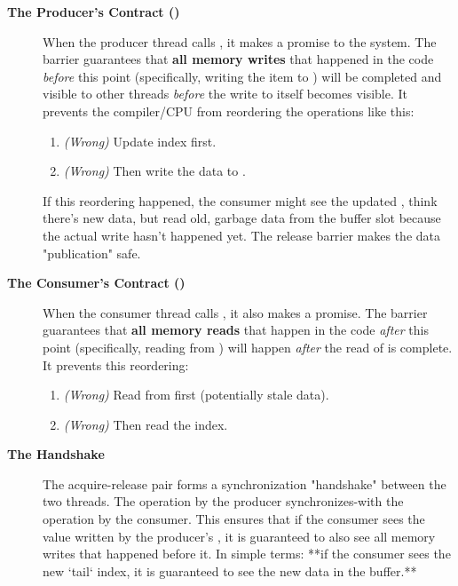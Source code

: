 \begin{description}
    \item[\textbf{The Producer's Contract ()}]
    When the producer thread calls , it makes a promise to the system. The  barrier guarantees that \textbf{all memory writes} that happened in the code \textit{before} this point (specifically, writing the item to ) will be completed and visible to other threads \textit{before} the write to  itself becomes visible. It prevents the compiler/CPU from reordering the operations like this:
    \begin{enumerate}
        \item \textit{(Wrong)} Update  index first.
        \item \textit{(Wrong)} Then write the data to .
    \end{enumerate}
    If this reordering happened, the consumer might see the updated , think there's new data, but read old, garbage data from the buffer slot because the actual write hasn't happened yet. The release barrier makes the data "publication" safe.

    \item[\textbf{The Consumer's Contract ()}]
    When the consumer thread calls , it also makes a promise. The  barrier guarantees that \textbf{all memory reads} that happen in the code \textit{after} this point (specifically, reading from ) will happen \textit{after} the read of  is complete. It prevents this reordering:
    \begin{enumerate}
        \item \textit{(Wrong)} Read from  first (potentially stale data).
        \item \textit{(Wrong)} Then read the  index.
    \end{enumerate}
    
    \item[\textbf{The Handshake}]
    The acquire-release pair forms a synchronization "handshake" between the two threads. The  operation by the producer synchronizes-with the  operation by the consumer. This ensures that if the consumer sees the value written by the producer's , it is guaranteed to also see all memory writes that happened before it. In simple terms: **if the consumer sees the new `tail` index, it is guaranteed to see the new data in the buffer.**
\end{description}


